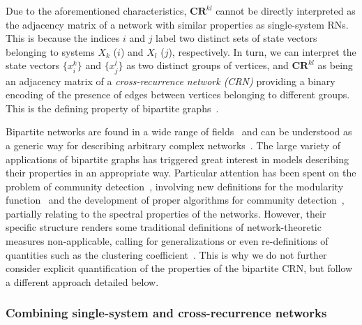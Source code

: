 \documentclass[graybox]{svmult}
\begin{document}
Due to the aforementioned characteristics, $\mathbf{CR}^{kl}$ cannot be directly interpreted as the adjacency matrix of a network with similar properties as single-system RNs. This is because the indices $i$ and $j$ label two distinct sets of state vectors belonging to systems $X_k$ ($i$) and $X_l$ ($j$), respectively. In turn, we can interpret the state vectors $\{x^k_i\}$ and $\{x^l_j\}$ as two distinct groups of vertices, and $\mathbf{CR}^{kl}$ as being an adjacency matrix of a \emph{cross-recurrence network (CRN)} providing a binary encoding of the presence of edges between vertices belonging to different groups. This is the defining property of bipartite graphs~\cite{Newman2003}.

Bipartite networks are found in a wide range of fields~\cite{Guimera2007,Kitsak2011} and can be understood as a generic way for describing arbitrary complex networks~\cite{Guillaume2004,Guillaume2006}. The large variety of applications of bipartite graphs has triggered great interest in models describing their properties in an appropriate way. Particular attention has been spent on the problem of community detection~\cite{Fortunato2010}, involving new definitions for the modularity function~\cite{Barber2007,Guimera2007,Murata2009,Suzuki2009} and the development of proper algorithms for community detection~\cite{Barber2007,Du2008,Lehmann2008,Sawardecker2009}, partially relating to the spectral properties of the networks. However, their specific structure renders some traditional definitions of network-theoretic measures non-applicable, calling for generalizations or even re-definitions of quantities such as the clustering coefficient~\cite{Lind2005,Zhang2008PhysA}. This is why we do not further consider explicit quantification of the properties of the bipartite CRN, but follow a different approach detailed below.


\subsubsection{Combining single-system and cross-recurrence networks}\label{sec:irn_idea}
\end{document}
